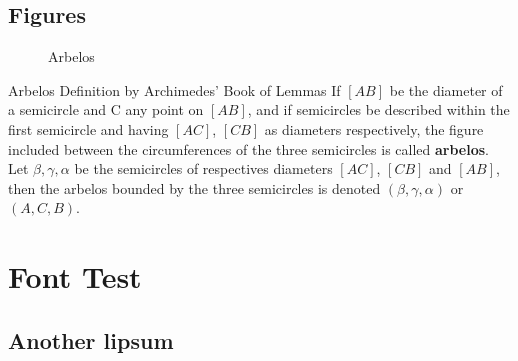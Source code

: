 \documentclass[11pt
              ,a4paper
              ,deepblue={hexagon(fg=primaryc,bg=primary,img=c3)}
              ]{SuperQIBook}
\newcommand*{\sqbname}[1]{\textbf{\textcolor{complement}{#1}}}
\def\pictureprimary{teal}
\begin{document}
\section{Figures}
\begin{figure}[H]
        \centering
        \centering
        \caption{Arbelos}
\end{figure}
\begin{qitheorem}[Lemma]{Arbelos Definition by Archimedes' Book of Lemmas}
        If\: $[AB]$ be the diameter of a semicircle and C any point on $[AB]$, and if semicircles
        be described within the first semicircle and having $[AC]$, $[CB]$  as diameters respectively,
        the figure included between the circumferences of the three semicircles is called \sqbname{arbelos}.
        Let $\beta, \gamma, \alpha$ be the semicircles of respectives diameters $[AC]$, $[CB]$ and $[AB]$,
        then the arbelos bounded by the three semicircles is denoted $(\beta,\gamma,\alpha)$ or $(A,C,B)$.
\end{qitheorem}
\chapter{Font Test}
\section{Another lipsum}
\end{document}
